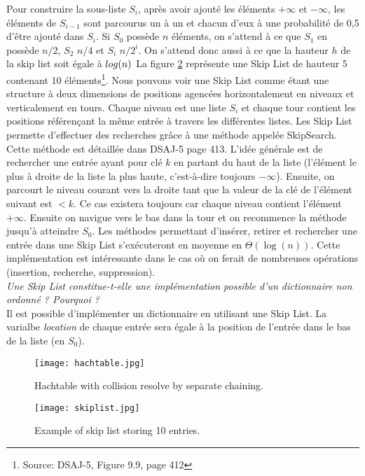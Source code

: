 \begin{enumerate}
			Pour construire la sous-liste $S_i$, après avoir ajouté les éléments $+\infty$ et $-\infty$, les éléments de $S_{i-1}$ sont parcourus un à un et chacun d'eux à une probabilité de 0,5 d'être ajouté dans $S_i$. Si $S_0$ possède $n$ éléments, on s'attend à ce que $S_1$ en possède $n/2$, $S_2$ $n/4$ et $S_i$ $n/2^i$. On s'attend donc aussi à ce que la hauteur $h$ de la skip list soit égale à $\\log (n)$
			La figure \ref{fig:skiplist} représente une Skip List de hauteur 5 contenant 10 éléments\footnote{Source: DSAJ-5, Figure 9.9, page 412}.
			Nous pouvons voir une Skip List comme étant une structure à deux dimensions de positions agencées horizontalement en niveaux et verticalement en tours. Chaque niveau est une liste $S_i$ et chaque tour contient les positions référençant la même entrée à travers les différentes listes.
			Les Skip List permette d'effectuer des recherches grâce à une méthode appelée SkipSearch. Cette méthode est détaillée dans DSAJ-5 page 413. L'idée générale est de rechercher une entrée ayant pour clé $k$ en partant du haut de la liste (l'élément le plus à droite de la liste la plus haute, c'est-à-dire toujours $-\infty$). Ensuite, on parcourt le niveau courant vers la droite tant que la valeur de la clé de l'élément suivant est $< k$. Ce cas existera toujours car chaque niveau contient l'élément $+\infty$. Ensuite on navigue vers le bas dans la tour et on recommence la méthode jusqu'à atteindre $S_0$.
			Les méthodes permettant d'insérer, retirer et rechercher une entrée dans une Skip List s'exécuteront en moyenne en $\Theta(\log(n))$.
			Cette implémentation est intéressante dans le cas où on ferait de nombreuses opérations (insertion, recherche, suppression).
			\\
			\textit{Une \textit{Skip List} constitue-t-elle une implémentation possible d'un dictionnaire non ordonné ? Pourquoi ?}
			\\
			Il est possible d'implémenter un dictionnaire en utilisant une Skip List. La varialbe \textit{location} de chaque entrée sera égale à la position de l'entrée dans le bas de la liste (en $S_0$).
\end{enumerate}

\begin{figure}
	\texttt{[image: hachtable.jpg]}
	\caption{Hachtable with collision resolve by separate chaining.}
	\label{fig:hashtable}
\end{figure}

\begin{figure}
	\texttt{[image: skiplist.jpg]}
	\caption{Example of skip list storing 10 entries.}
	\label{fig:skiplist}
\end{figure}
